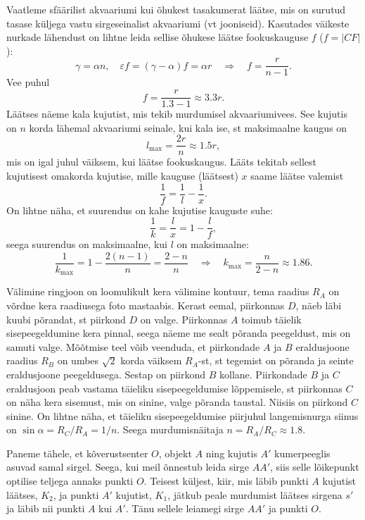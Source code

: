 \documentclass[10pt, twoside]{article}
\begin{document}
{Vaatleme sfäärilist akvaariumi kui õhukest tasakumerat läätse, mis on surutud tasase küljega vastu sirgeseinalist akvaariumi (vt jooniseid). Kasutades väikeste nurkade lähendust on lihtne leida sellise õhukese läätse fookuskauguse $f$ ($f = |CF|$):
\[
\gamma=\alpha n, \quad \varepsilon f=(\gamma-\alpha) f=\alpha r \quad \Rightarrow \quad f=\frac{r}{n-1}.
\]
Vee puhul
\[
f=\frac{r}{\num{1,3}-\num{1}} \approx \num{3,3} r.
\]
Läätses näeme kala kujutist, mis tekib murdumisel akvaariumivees. See kujutis on $n$ korda lähemal akvaariumi seinale, kui kala ise, st maksimaalne kaugus on
\[
l_{\max }=\frac{2 r}{n} \approx \num{1,5} r,
\]
mis on igal juhul väiksem, kui läätse fookuskaugus. Lääts tekitab sellest kujutisest omakorda kujutise, mille kauguse (läätsest) $x$ saame läätse valemist
\[
\frac{1}{f}=\frac{1}{l}-\frac{1}{x}.
\]
On lihtne näha, et suurendus on kahe kujutise kauguste suhe:
\[
\frac{1}{k}=\frac{l}{x}=1-\frac{l}{f},
\]
seega suurendus on maksimaalne, kui $l$ on maksimaalne:
\[
\frac{1}{k_{\max }}=1-\frac{2(n-1)}{n}=\frac{2-n}{n} \quad\Rightarrow\quad k_{\max }=\frac{n}{2-n} \approx \num{1,86}.
\]
\probend
\bigskip


\solu
Välimine ringjoon on loomulikult kera välimine kontuur, tema raadius $R_A$ on võrdne kera raadiusega foto mastaabis. Kerast eemal, piirkonnas $D$, näeb läbi kuubi põrandat, st piirkond $D$ on valge. Piirkonnas $A$ toimub täielik sisepeegeldumine kera pinnal, seega näeme me sealt põranda peegeldust, mis on samuti valge. Mõõtmise teel võib veenduda, et piirkondade $A$ ja $B$ eraldusjoone raadius $R_B$ on umbes $\sqrt 2$ korda väiksem $R_A$-st, st tegemist on põranda ja seinte eraldusjoone peegeldusega. Sestap on piirkond $B$ kollane. Piirkondade $B$ ja $C$ eraldusjoon peab vastama täieliku sisepeegeldumise lõppemisele, st piirkonnas $C$ on näha kera sisemust, mis on sinine, valge põranda taustal. Niisiis on piirkond $C$ sinine. On lihtne näha, et täieliku sisepeegeldumise piirjuhul langemisnurga siinus on $\sin \alpha = R_C/R_A = 1/n$. Seega murdumisnäitaja $n = R_A/R_C \approx \num{1,8}$.
\probend
\bigskip


\solu
Paneme tähele, et kõverustsenter $O$, objekt $A$ ning kujutis $A'$ kumerpeeglis asuvad samal sirgel. Seega, kui meil õnnestub leida sirge $AA'$, siis selle lõikepunkt optilise teljega annaks punkti $O$. Teisest küljest, kiir, mis läbib punkti $A$ kujutist läätses, $K_2$, ja punkti $A'$ kujutist, $K_1$, jätkub peale murdumist läätses sirgena $s'$ ja läbib nii punkti $A$ kui $A'$. Tänu sellele leiamegi sirge $AA'$ ja punkti $O$.

}
\end{document}
